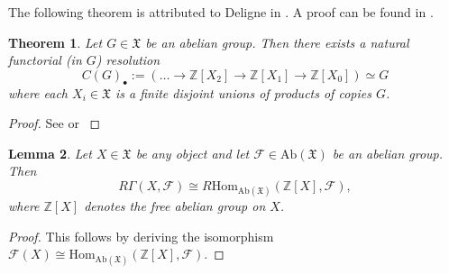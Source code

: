 \documentclass{amsart}
\theoremstyle{plain}
\newtheorem{theorem}{Theorem}[subsection]
\newtheorem{lemma}[theorem]{Lemma}
\theoremstyle{definition}
\newcommand{\Z}{\mathbb{Z}}
\begin{document}
The following theorem is attributed to Deligne in \cite{berthelot_breen_messing_theorie_de_dieudonne_cristalline_II}. A proof can be found in \cite[Appendix to Lecture IV, Theorem 4.10]{scholze_lectures_on_condensed_mathematics}.

\begin{theorem}
\label{sec:calc-ext-sheav-canonical-resolution-of-abelian-group}
Let $G\in \mathrm{\mathfrak{X}}$ be an abelian group. Then there exists a natural functorial (in $G$) resolution
$$
C(G)_\bullet:=(\ldots \to \Z[X_2]\to \Z[X_1]\to \Z[X_0])\simeq G
$$
where each $X_i\in \mathfrak{X}$ is a finite disjoint unions of products of copies $G$.
\end{theorem}
\begin{proof}
See \cite[2.1.5]{berthelot_breen_messing_theorie_de_dieudonne_cristalline_II} or \cite[Appendix to Lecture IV, Theorem 4.10]{scholze_lectures_on_condensed_mathematics}  
\end{proof}


\begin{lemma}
\label{sec:calc-ext-sheav-derived-yoneda-lemma}
Let $X\in \mathfrak{X}$ be any object and let $\mathcal{F}\in \mathrm{Ab}(\mathfrak{X})$ be an abelian group. Then
$$
R\Gamma(X,\mathcal{F})\cong R\mathrm{Hom}_{\mathrm{Ab}(\mathfrak{X})}(\Z[X],\mathcal{F}),
$$
where $\Z[X]$ denotes the free abelian group on $X$. 
\end{lemma}
\begin{proof}
This follows by deriving the isomorphism $\mathcal{F}(X)\cong \mathrm{Hom}_{\mathrm{Ab}(\mathfrak{X})}(\Z[X],\mathcal{F}).$
\end{proof}
\end{document}
